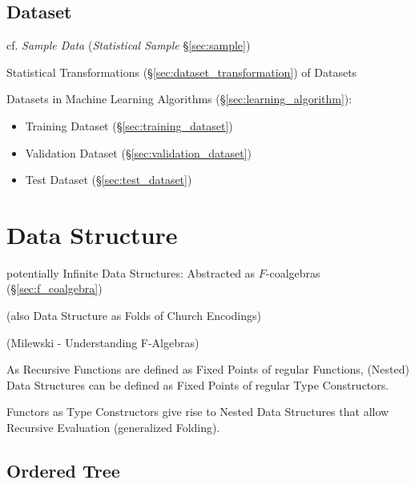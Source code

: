 \subsection{Dataset}\label{sec:dataset}

cf. \emph{Sample Data} (\emph{Statistical Sample} \S\ref{sec:sample})

\fist Statistical Transformations (\S\ref{sec:dataset_transformation}) of
Datasets

Datasets in Machine Learning Algorithms (\S\ref{sec:learning_algorithm}):
\begin{itemize}
  \item Training Dataset (\S\ref{sec:training_dataset})
  \item Validation Dataset (\S\ref{sec:validation_dataset})
  \item Test Dataset (\S\ref{sec:test_dataset})
\end{itemize}



\section{Data Structure}\label{sec:data_structure}


potentially Infinite Data Structures: Abstracted as $F$-coalgebras
(\S\ref{sec:f_coalgebra})

(also Data Structure as Folds of Church Encodings)

(Milewski - Understanding F-Algebras)

As Recursive Functions are defined as Fixed Points of regular
Functions, (Nested) Data Structures can be defined as Fixed Points of
regular Type Constructors.

Functors as Type Constructors give rise to Nested Data Structures that
allow Recursive Evaluation (generalized Folding).



\subsection{Ordered Tree}\label{sec:ordered_tree}

